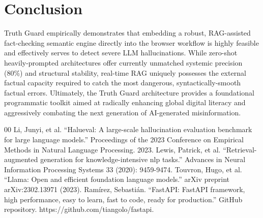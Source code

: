 \documentclass[conference]{IEEEtran}
\begin{document}
\section{Conclusion}
Truth Guard empirically demonstrates that embedding a robust, RAG-assisted fact-checking semantic engine directly into the browser workflow is highly feasible and effectively serves to detect severe LLM hallucinations. While zero-shot heavily-prompted architectures offer currently unmatched systemic precision (80\%) and structural stability, real-time RAG uniquely possesses the external factual capacity required to catch the most dangerous, syntactically-smooth factual errors. Ultimately, the Truth Guard architecture provides a foundational programmatic toolkit aimed at radically enhancing global digital literacy and aggressively combating the next generation of AI-generated misinformation.

\begin{thebibliography}{00}
 Li, Junyi, et al. ``Halueval: A large-scale hallucination evaluation benchmark for large language models.'' Proceedings of the 2023 Conference on Empirical Methods in Natural Language Processing. 2023.
 Lewis, Patrick, et al. ``Retrieval-augmented generation for knowledge-intensive nlp tasks.'' Advances in Neural Information Processing Systems 33 (2020): 9459-9474.
 Touvron, Hugo, et al. ``Llama: Open and efficient foundation language models.'' arXiv preprint arXiv:2302.13971 (2023).
 Ram\'irez, Sebasti\'an. ``FastAPI: FastAPI framework, high performance, easy to learn, fast to code, ready for production.'' GitHub repository. https://github.com/tiangolo/fastapi.
\end{thebibliography}
\end{document}
